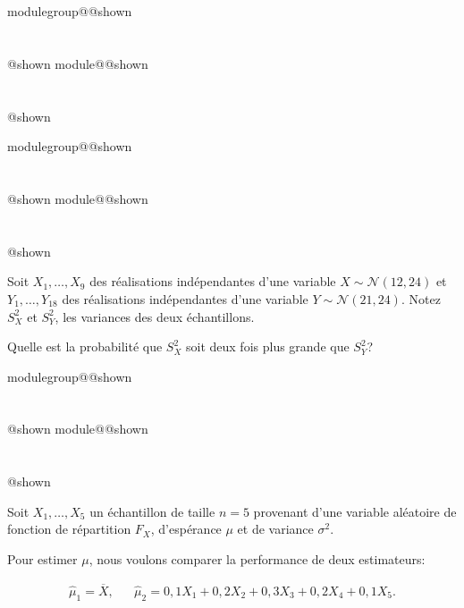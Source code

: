 \documentclass{Evaluation}
\makeatletter
\newcommand{\currentmodulekey}{}
\newcommand{\currentmoduletitle}{}
\newcommand{\currentgroupkey}{}
\newcommand{\currentgrouptitle}{}
\newcommand{\showmoduleifneeded}{%
  \ifx\currentgroupkey\empty\else
    \expandafter\ifx\csname modulegroup@\currentgroupkey @shown\endcsname\relax
      \section*{\currentgrouptitle}%
      \expandafter\gdef\csname modulegroup@\currentgroupkey @shown\endcsname{1}%
    \fi
  \fi
  \expandafter\ifx\csname module@\currentmodulekey @shown\endcsname\relax
    \section*{\currentmoduletitle}%
    \expandafter\gdef\csname module@\currentmodulekey @shown\endcsname{1}%
  \fi
}
\newenvironment{H23}{\showmoduleifneeded}{}
\newenvironment{H25}{\showmoduleifneeded}{}
\newenvironment{H26r}{\showmoduleifneeded}{}
\makeatother
\begin{document}
\begin{questions}
\begin{H23}
\end{H23}

\begin{H25}
\question {} %
Soit $X_1,\hdots,X_9$ des réalisations indépendantes d'une variable $X\sim\mathcal{N}(12, 24)$ et $Y_1,\hdots,Y_{18}$ des réalisations indépendantes d'une variable $Y\sim\mathcal{N}(21, 24)$.
Notez $S_X^2$ et $S_Y^2$, les variances des deux échantillons.

Quelle est la probabilité que $S_X^2$ soit deux fois plus grande que $S_Y^2$?
\end{H25}

\begin{H26r}
\question {} %
Soit $X_1,\hdots,X_5$ un échantillon de taille $n=5$ provenant d'une variable aléatoire de fonction de répartition $F_X$, d'espérance $\mu$ et de variance $\sigma^2$.

    Pour estimer $\mu$, nous voulons comparer la performance de deux estimateurs:

    \begin{align*}
        \hat{\mu}_1=\overline{X}, & & \hat{\mu}_2=0{,}1X_1+0{,}2X_2+0{,}3X_3+0{,}2X_4+0{,}1X_5.
    \end{align*}


\end{H26r}
\end{questions}
\end{document}
